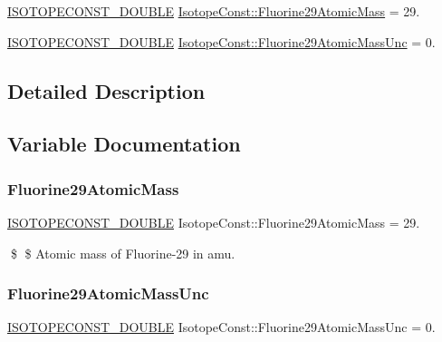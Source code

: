 \begin{DoxyCompactItemize}
\item 
\mbox{\hyperlink{group___isotope_const-_macros_ga8f45a7272ce02c0b4c65c44636ed719a}{I\+S\+O\+T\+O\+P\+E\+C\+O\+N\+S\+T\+\_\+\+D\+O\+U\+B\+LE}} \mbox{\hyperlink{group___isotope_const-_fluorine-_f29_ga2375af2d61b8b6f7f75e13cbf988bd89}{Isotope\+Const\+::\+Fluorine29\+Atomic\+Mass}} = 29.
\item 
\mbox{\hyperlink{group___isotope_const-_macros_ga8f45a7272ce02c0b4c65c44636ed719a}{I\+S\+O\+T\+O\+P\+E\+C\+O\+N\+S\+T\+\_\+\+D\+O\+U\+B\+LE}} \mbox{\hyperlink{group___isotope_const-_fluorine-_f29_ga1a615e843fe8ca4e3304be2c47b62185}{Isotope\+Const\+::\+Fluorine29\+Atomic\+Mass\+Unc}} = 0.
\end{DoxyCompactItemize}


\subsection{Detailed Description}


\subsection{Variable Documentation}
\mbox{\label{group___isotope_const-_fluorine-_f29_ga2375af2d61b8b6f7f75e13cbf988bd89}} 
\subsubsection{\texorpdfstring{Fluorine29\+Atomic\+Mass}{Fluorine29AtomicMass}}
{\footnotesize\ttfamily \mbox{\hyperlink{group___isotope_const-_macros_ga8f45a7272ce02c0b4c65c44636ed719a}{I\+S\+O\+T\+O\+P\+E\+C\+O\+N\+S\+T\+\_\+\+D\+O\+U\+B\+LE}} Isotope\+Const\+::\+Fluorine29\+Atomic\+Mass = 29.}

\$ \$ Atomic mass of Fluorine-\/29 in amu. \mbox{\label{group___isotope_const-_fluorine-_f29_ga1a615e843fe8ca4e3304be2c47b62185}} 
\subsubsection{\texorpdfstring{Fluorine29\+Atomic\+Mass\+Unc}{Fluorine29AtomicMassUnc}}
{\footnotesize\ttfamily \mbox{\hyperlink{group___isotope_const-_macros_ga8f45a7272ce02c0b4c65c44636ed719a}{I\+S\+O\+T\+O\+P\+E\+C\+O\+N\+S\+T\+\_\+\+D\+O\+U\+B\+LE}} Isotope\+Const\+::\+Fluorine29\+Atomic\+Mass\+Unc = 0.}

